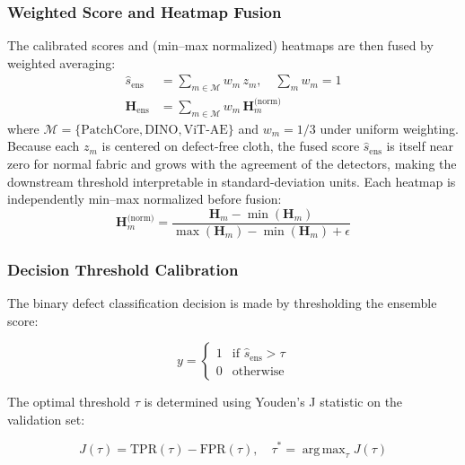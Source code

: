 \documentclass[journal]{IEEEtran}
\DeclareMathOperator*{\argmax}{arg\,max}
\begin{document}
\subsubsection{Weighted Score and Heatmap Fusion}

The calibrated scores and (min--max normalized) heatmaps are then fused by weighted averaging:
\begin{align}
    \hat{s}_{\text{ens}} &= \sum_{m \in \mathcal{M}} w_m \, z_m, \quad \sum_m w_m = 1 \\
    \mathbf{H}_{\text{ens}} &= \sum_{m \in \mathcal{M}} w_m \, \mathbf{H}^{\text{(norm)}}_m
    \label{eq:ensemble}
\end{align}
where $\mathcal{M} = \{\text{PatchCore}, \text{DINO}, \text{ViT-AE}\}$ and $w_m = 1/3$ under uniform weighting. Because each $z_m$ is centered on defect-free cloth, the fused score $\hat{s}_{\text{ens}}$ is itself near zero for normal fabric and grows with the agreement of the detectors, making the downstream threshold interpretable in standard-deviation units. Each heatmap is independently min--max normalized before fusion:
\begin{equation}
    \mathbf{H}^{\text{(norm)}}_m = \frac{\mathbf{H}_m - \min(\mathbf{H}_m)}{\max(\mathbf{H}_m) - \min(\mathbf{H}_m) + \epsilon}
    \label{eq:heatmap_norm}
\end{equation}

\subsubsection{Decision Threshold Calibration}

The binary defect classification decision is made by thresholding the ensemble score:

\begin{equation}
    y = \begin{cases}
        1 & \text{if } \hat{s}_{\text{ens}} > \tau \\
        0 & \text{otherwise}
    \end{cases}
    \label{eq:decision}
\end{equation}

The optimal threshold $\tau$ is determined using Youden's J statistic on the validation set:

\begin{equation}
    J(\tau) = \text{TPR}(\tau) - \text{FPR}(\tau), \quad \tau^* = \argmax_{\tau} J(\tau)
    \label{eq:youden}
\end{equation}
\end{document}
